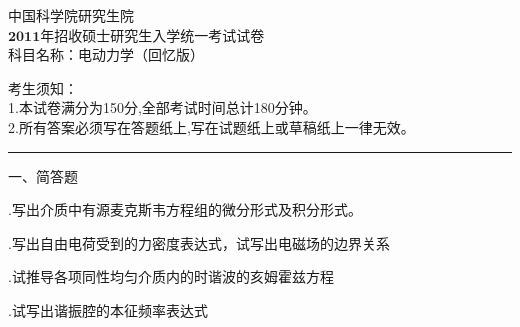 \begin{center}
	\heiti
	\LARGE{中国科学院研究生院\\$\boldsymbol{2011}$年招收硕士研究生入学统一考试试卷\\
	科目名称：电动力学（回忆版）}

\end{center}
\noindent
考生须知：\\
1.本试卷满分为150分,全部考试时间总计180分钟。\\
2.所有答案必须写在答题纸上,写在试题纸上或草稿纸上一律无效。

\vspace*{2ex}
\hrule
\vspace*{4ex}


\setcounter{page}{1}%
\pagestyle{mypagestyle}

\onehalfspacing
\vspace{0.4cm}

\noindent
一、简答题
\vspace{0.2cm}

.\hspace{0.8em}写出介质中有源麦克斯韦方程组的微分形式及积分形式。
\vspace{0.2cm}

.\hspace{0.8em}写出自由电荷受到的力密度表达式，试写出电磁场的边界关系
\vspace{0.2cm}

.\hspace{0.8em}试推导各项同性均匀介质内的时谐波的亥姆霍兹方程
\vspace{0.2cm}

.\hspace{0.8em}试写出谐振腔的本征频率表达式
\vspace{0.2cm}

